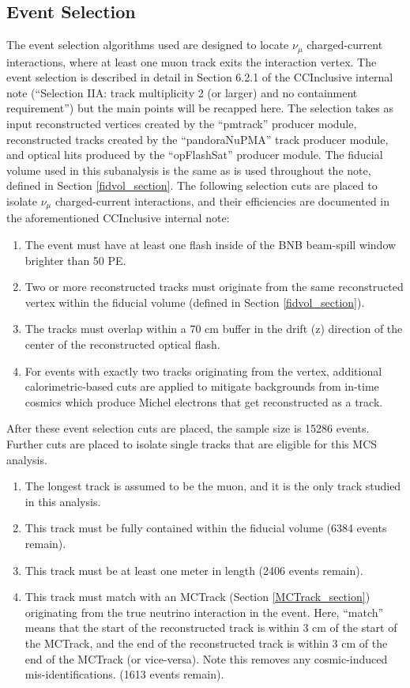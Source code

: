 \subsection{Event Selection}\label{MC_BNB_eventselection_section}
The event selection algorithms used are designed to locate $\nu_\mu$ charged-current interactions, where at least one muon track exits the interaction vertex. The event selection is described in detail in Section 6.2.1 of the {\ub} CCInclusive internal note (``Selection IIA: track multiplicity 2 (or larger) and no containment requirement'')\cite{CCIncInternalNote}  but the main points will be recapped here. The selection takes as input reconstructed vertices created by the ``pmtrack'' producer module, reconstructed tracks created by the ``pandoraNuPMA'' track producer module, and optical hits produced by the ``opFlashSat'' producer module. The fiducial volume used in this subanalysis is the same as is used throughout the note, defined in Section \ref{fidvol_section}. The following selection cuts are placed to isolate $\nu_\mu$ charged-current interactions, and their efficiencies are documented in the aforementioned CCInclusive internal note:
\begin{enumerate}
\item The event must have at least one flash inside of the BNB beam-spill window brighter than 50 PE.
\item Two or more reconstructed tracks must originate from the same reconstructed vertex within the fiducial volume (defined in Section \ref{fidvol_section}).
\item The tracks must overlap within a 70 cm buffer in the drift (z) direction of the center of the reconstructed optical flash.
\item For events with exactly two tracks originating from the vertex, additional calorimetric-based cuts are applied to mitigate backgrounds from in-time cosmics which produce Michel electrons that get reconstructed as a track.
\end{enumerate}
After these event selection cuts are placed, the sample size is 15286 events. Further cuts are placed to isolate single tracks that are eligible for this MCS analysis. 
\begin{enumerate}
\item The longest track is assumed to be the muon, and it is the only track studied in this analysis. 
\item This track must be fully contained within the fiducial volume (6384 events remain).
\item This track must be at least one meter in length (2406 events remain).
\item This track must match with an {\sc MCTrack} (Section \ref{MCTrack_section}) originating from the true neutrino interaction in the event. Here, ``match'' means that the start of the reconstructed track is within 3 cm of the start of the {\sc MCTrack}, and the end of the reconstructed track is within 3 cm of the end of the {\sc MCTrack} (or vice-versa). Note this removes any cosmic-induced mis-identifications. (1613 events remain).

\end{enumerate}

